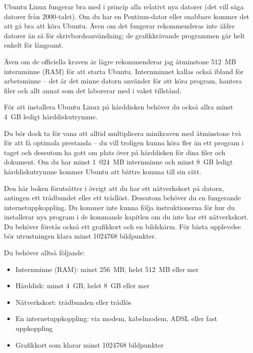 \documentclass[a4paper,final]{memoir} %
\begin{document}

Ubuntu Linux fungerar bra med i princip alla relativt nya datorer (det vill säga datorer från 2000-talet). Om du har en Pentium-dator eller snabbare kommer det att gå bra att köra Ubuntu. Även om det fungerar rekommenderas inte äldre datorer än så för skrivbordsanvändning; de grafikkrävande programmen går helt enkelt för långsamt.

Även om de officiella kraven är lägre rekommenderar jag åtminstone 512~MB internminne (RAM) för att starta Ubuntu. Internminnet kallas också ibland för arbetsminne -- det är det minne datorn använder för att köra program, hantera filer och allt annat som det laborerar med i vaket tillstånd. 

För att installera Ubuntu Linux på hårddisken behöver du också allra minst 4~GB ledigt hårddiskutrymme. 

Du bör dock ta för vana att alltid multiplicera minikraven med åtminstone två för att få optimala prestanda -- du vill troligen kunna köra fler än ett program i taget och dessutom ha gott om plats över på hårddisken för dina filer och dokument. Om du har minst 1~024~MB internminne och minst 8~GB ledigt hårddiskutrymme kommer Ubuntu att bättre komma till sin rätt.

Den här boken förutsätter i övrigt att du har ett nätverkskort på datorn, antingen ett trådbundet eller ett trådlöst. Dessutom behöver du en fungerande internetuppkoppling. Du kommer inte kunna följa instruktionerna för hur du installerar nya program i de kommande kapitlen om du inte har ett nätverkskort. Du behöver förstås också ett grafikkort och en bildskärm. För bästa upplevelse bör utrustningen klara minst 1024\texttimes{}768 bildpunkter.

Du behöver alltså följande:

\begin{itemize}

\item Internminne (RAM): minst 256~MB, helst 512~MB eller mer
\item Hårddisk: minst 4~GB, helst 8~GB eller mer
\item Nätverkskort: trådbunden eller trådlös
\item En internetuppkoppling: via modem, kabelmodem, ADSL eller fast uppkoppling
\item Grafikkort som klarar minst 1024\texttimes{}768 bildpunkter

\end{itemize}
\end{document}
